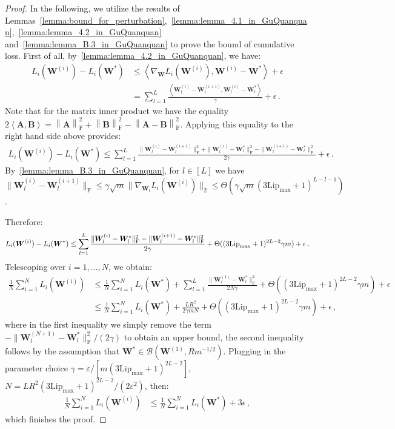 \documentclass[nohyperref]{article}
\theoremstyle{plain}
\theoremstyle{definition}
\theoremstyle{remark}
\begin{document}
\begin{proof}
In the following, we utilize the results of Lemmas~\ref{lemma:bound_for_perturbation},~\ref{lemma:lemma_4.1_in_GuQuanquan},~\ref{lemma:lemma_4.2_in_GuQuanquan} and~\ref{lemma:lemma_B.3_in_GuQuanquan} to prove the bound of cumulative loss. First of all, by~\cref{lemma:lemma_4.2_in_GuQuanquan}, we have:
\begin{align*}
    L_i(\bm{W}^{(i)}) - L_i(\bm{W}^{*}) &\leq  \left \langle  \nabla_{\bm{W}} L_i(\bm{W}^{(i)}), \bm{W}^{(i)} - \bm{W}^*  \right \rangle  + \epsilon \\
    &= \sum_{l=1}^L \frac{\left \langle  \bm{W}_l^{(i)} - \bm{W}_l^{(i+1)}, \bm{W}_l^{(i)} - \bm{W}_l^*  \right \rangle  }{ \gamma } + \epsilon\,.
\end{align*}
Note that for the matrix inner product we have the equality $2\left \langle \bm{A},\bm{B} \right \rangle = \left \| \bm{A} \right \| _{\mathrm{F}}^2 + \left \| \bm{B} \right \| _{\mathrm{F}}^2 - \left \| \bm{A-B} \right \| _{\mathrm{F}}^2$. Applying this equality to the right hand side above provides:
\begin{align*}L_i(\bm{W}^{(i)}) - L_i(\bm{W}^{*}) \leq \sum_{l=1}^L \frac{ \| \bm{W}_l^{(i)} - \bm{W}_l^{(i+1)} \|_{\mathrm{F}}^2 + \| \bm{W}_l^{(i)} - \bm{W}_l^* \|_{\mathrm{F}}^2 - \| \bm{W}_l^{(i+1)} - \bm{W}_l^* \|_{\mathrm{F}}^2 } {2\gamma} + \epsilon\,.
\end{align*}
By~\cref{lemma:lemma_B.3_in_GuQuanquan}, for $l\in [L]$ we have $\| \bm{W}_l^{(i)} - \bm{W}_l^{(i+1)} \|_{\mathrm{F}} \leq \gamma\sqrt{m}\|\nabla_{\bm{W}_l} L_i(\bm{W}^{(i)})\|_2 \leq \Theta (\gamma\sqrt{m}(3\mathrm{Lip}_{\max}+1)^{L-l-1})$. 

Therefore:
\begin{align*}
\small
    L_i(\bm{W}^{(i)}) - L_i(\bm{W}^{*}) \leq \sum_{l=1}^L \frac{ \| \bm{W}_l^{(i)} - \bm{W}_l^* \|_{\mathrm{F}}^2 - \| \bm{W}_l^{(i+1)} - \bm{W}_l^* \|_{\mathrm{F}}^2 } {2\gamma} + \Theta ((3\mathrm{Lip}_{\max}+1)^{2L-2}\gamma m) + \epsilon\,.
\end{align*}
Telescoping over $i = 1,\ldots, N$, we obtain:
\begin{align*}
    \frac{1}{N}\sum_{i=1}^N L_i(\bm{W}^{(i)}) &\leq \frac{1}{N}\sum_{i=1}^N L_i(\bm{W}^{*}) + \sum_{l=1}^L \frac{ \| \bm{W}_l^{(1)} - \bm{W}_l^* \|_{\mathrm{F}}^2 } {2N\gamma} + \Theta ((3\mathrm{Lip}_{\max}+1)^{2L-2}\gamma m) + \epsilon\\
    &\leq \frac{1}{N}\sum_{i=1}^N L_i(\bm{W}^{*}) + \frac{ L R^{2} } {2\gamma mN} + \Theta ((3\mathrm{Lip}_{\max}+1)^{2L-2}\gamma m) + \epsilon\,,
\end{align*}
where in the first inequality we simply remove the term $-\| \bm{W}_l^{(N+1)} - \bm{W}_l^* \|_{\mathrm{F}}^2/(2\gamma) $ to obtain an upper bound, the second inequality follows by the assumption that $\bm{W}^*\in \mathcal{B} (\bm{W}^{(1)},Rm^{-1/2})$. 
Plugging in the parameter choice 
$\gamma = \varepsilon/[m(3\mathrm{Lip}_{\max}+1)^{2L-2}]$, $N = LR^2(3\mathrm{Lip}_{\max}+1)^{2L-2}/(2\varepsilon^2)$, then:
\begin{align*}\frac{1}{N}\sum_{i=1}^N L_i(\bm{W}^{(i)}) &\leq \frac{1}{N}\sum_{i=1}^N L_i(\bm{W}^{*}) + 3\epsilon\,,
\end{align*}
which finishes the proof.
\end{proof}
\end{document}
